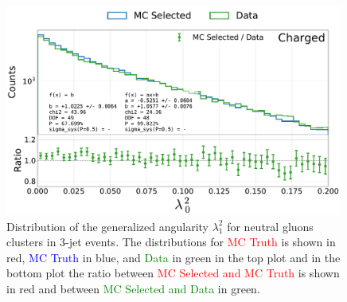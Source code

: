 \begin{figure}[h!]
  \centerfloat
  \includegraphics[width=0.99\textwidth, trim=0 0 0 0, clip, page=9]{figures/quarks/generalized_angularities_cha-down_sample=1.00-ML_vars=vertex-selection=b-ejet_min=4-n_iter_RS_lgb=99-n_iter_RS_xgb=9-cdot_cut=0.90-version=19.pdf}
  \caption[Generalized Angularities for Neutral Gluons Jets: $\lambda_1^2$]
          {Distribution of the generalized angularity $\lambda_1^2$ for neutral gluons clusters in 3-jet events. The distributions for \textcolor{red}{MC Truth} is shown in red, \textcolor{blue}{MC Truth} in blue, and \textcolor{green}{Data} in green in the top plot and in the bottom plot the ratio between \textcolor{red}{MC Selected and MC Truth} is shown in red and between \textcolor{green}{MC Selected and Data} in green. }
  \label{fig:q:generalized_angularities_neu_lambda_1_2}
\end{figure}
